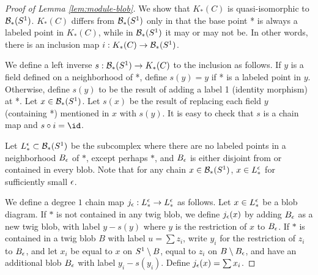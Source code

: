 \begin{proof}[Proof of Lemma \ref{lem:module-blob}]
We show that $K_*(C)$ is quasi-isomorphic to ${\mathcal B}_*(S^1)$.
$K_*(C)$ differs from ${\mathcal B}_*(S^1)$ only in that the base point *
is always a labeled point in $K_*(C)$, while in ${\mathcal B}_*(S^1)$ it may or may not be.
In other words, there is an inclusion map $i: K_*(C) \to {\mathcal B}_*(S^1)$.

We define a left inverse $s: {\mathcal B}_*(S^1) \to K_*(C)$ to the inclusion as follows.
If $y$ is a field defined on a neighborhood of *, define $s(y) = y$ if
* is a labeled point in $y$.
Otherwise, define $s(y)$ to be the result of adding a label 1 (identity morphism) at *.
Let $x \in {\mathcal B}_*(S^1)$.
Let $s(x)$ be the result of replacing each field $y$ (containing *) mentioned in
$x$ with $s(y)$.
It is easy to check that $s$ is a chain map and $s \circ i = \id$.

Let $L_*^\epsilon \subset {\mathcal B}_*(S^1)$ be the subcomplex where there are no labeled points
in a neighborhood $B_\epsilon$ of $*$, except perhaps $*$, and $B_\epsilon$ is either disjoint from or contained in every blob.
Note that for any chain $x \in {\mathcal B}_*(S^1)$, $x \in L_*^\epsilon$ for sufficiently small $\epsilon$.

We define a degree $1$ chain map $j_\epsilon: L_*^\epsilon \to L_*^\epsilon$ as follows. Let $x \in L_*^\epsilon$ be a blob diagram.
If $*$ is not contained in any twig blob, we define $j_\epsilon(x)$ by adding $B_\epsilon$ as a new twig blob, with label $y - s(y)$ where $y$ is the restriction
of $x$ to $B_\epsilon$. If $*$ is contained in a twig blob $B$ with label $u=\sum z_i$,
write $y_i$ for the restriction of $z_i$ to $B_\epsilon$, and let
$x_i$ be equal to $x$ on $S^1 \setminus B$, equal to $z_i$ on $B \setminus B_\epsilon$,
and have an additional blob $B_\epsilon$ with label $y_i - s(y_i)$.
Define $j_\epsilon(x) = \sum x_i$.
\end{proof}
